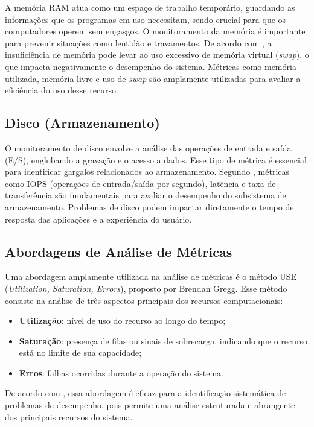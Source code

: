\documentclass[
    12pt
    ,oneside
    ,a4paper
    ,chapter=TITLE
    ,section=TITLE
    ,sumario=abnt-6027-2012]{abntex2}
\begin{document}
A memória RAM atua como um espaço de trabalho temporário, guardando as informações que os programas em uso necessitam, sendo crucial para que os computadores operem sem engasgos. O monitoramento da memória é importante para prevenir situações como lentidão e travamentos. De acordo com , a insuficiência de memória pode levar ao uso excessivo de memória virtual (\textit{swap}), o que impacta negativamente o desempenho do sistema. Métricas como memória utilizada, memória livre e uso de \textit{swap} são amplamente utilizadas para avaliar a eficiência do uso desse recurso.

\subsection{Disco (Armazenamento)}

O monitoramento de disco envolve a análise das operações de entrada e saída (E/S), englobando a gravação e o acesso a dados. Esse tipo de métrica é essencial para identificar gargalos relacionados ao armazenamento. Segundo , métricas como IOPS (operações de entrada/saída por segundo), latência e taxa de transferência são fundamentais para avaliar o desempenho do subsistema de armazenamento. Problemas de disco podem impactar diretamente o tempo de resposta das aplicações e a experiência do usuário.

\subsection{Abordagens de Análise de Métricas}

Uma abordagem amplamente utilizada na análise de métricas é o método USE (\textit{Utilization, Saturation, Errors}), proposto por Brendan Gregg. Esse método consiste na análise de três aspectos principais dos recursos computacionais:

\begin{itemize}
    \item \textbf{Utilização}: nível de uso do recurso ao longo do tempo;
    \item \textbf{Saturação}: presença de filas ou sinais de sobrecarga, indicando que o recurso está no limite de sua capacidade;
    \item \textbf{Erros}: falhas ocorridas durante a operação do sistema.
\end{itemize}

De acordo com , essa abordagem é eficaz para a identificação sistemática de problemas de desempenho, pois permite uma análise estruturada e abrangente dos principais recursos do sistema.
\end{document}
